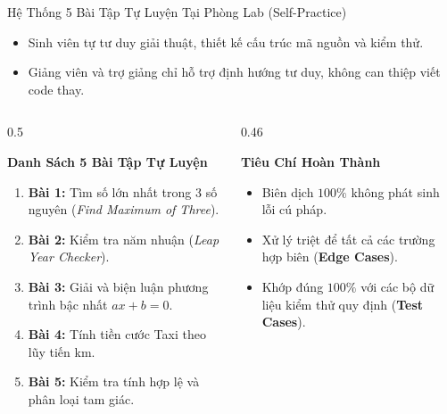 \documentclass[aspectratio=169, 10pt]{beamer}
\begin{document}
\begin{frame}{Hệ Thống 5 Bài Tập Tự Luyện Tại Phòng Lab (Self-Practice)}
  \begin{tcolorbox}[colback=UniNavy,colframe=UniNavy,title=\color{white}\textbf{Yêu Cầu Tự Luyện Độc Lập Tại Lớp (Không Có Mã Nguồn Giải Sẵn)}]
    \begin{itemize}
      \item Sinh viên tự tư duy giải thuật, thiết kế cấu trúc mã nguồn và kiểm thử.
      \item Giảng viên và trợ giảng chỉ hỗ trợ định hướng tư duy, không can thiệp viết code thay.
    \end{itemize}
  \end{tcolorbox}
  \begin{columns}[T]
    \begin{column}{0.5\textwidth}
      \begin{block}{\textbf{Danh Sách 5 Bài Tập Tự Luyện}}
        \begin{enumerate}
          \item \textbf{Bài 1:} Tìm số lớn nhất trong 3 số nguyên (\textit{Find Maximum of Three}).
          \item \textbf{Bài 2:} Kiểm tra năm nhuận (\textit{Leap Year Checker}).
          \item \textbf{Bài 3:} Giải và biện luận phương trình bậc nhất $ax + b = 0$.
          \item \textbf{Bài 4:} Tính tiền cước Taxi theo lũy tiến km.
          \item \textbf{Bài 5:} Kiểm tra tính hợp lệ và phân loại tam giác.
        \end{enumerate}
      \end{block}
    \end{column}
    \begin{column}{0.46\textwidth}
      \begin{exampleblock}{\textbf{Tiêu Chí Hoàn Thành}}
        \begin{itemize}
          \item Biên dịch $100\%$ không phát sinh lỗi cú pháp.
          \item Xử lý triệt để tất cả các trường hợp biên (\textbf{Edge Cases}).
          \item Khớp đúng $100\%$ với các bộ dữ liệu kiểm thử quy định (\textbf{Test Cases}).
        \end{itemize}
      \end{exampleblock}
    \end{column}
  \end{columns}
\end{frame}
\end{document}
